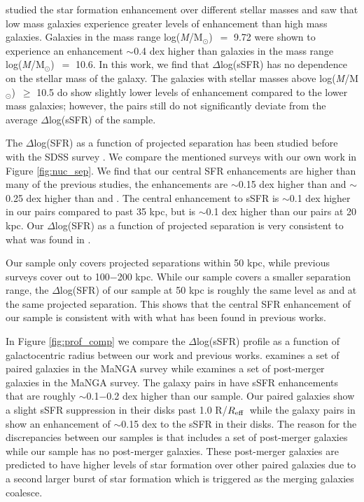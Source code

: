 \documentclass[iop,revtex4,twocolumn,apj,numberedappendix,appendixfloats]{emulateapj}
\newcommand{\reff}{$R_{\rm eff}$}
\newcommand{\logm}{log({\it M}/M$_{\odot}$)}
\begin{document}
\citet{Li:2008} studied the star formation enhancement over different stellar masses and saw that low mass galaxies experience greater levels of enhancement than high mass galaxies.  Galaxies in the mass range \logm\ $=$ 9.72 were shown to experience an enhancement $\sim$0.4 dex higher than galaxies in the mass range \logm\ $=$ 10.6. In this work, we find that $\Delta$log(sSFR) has no dependence on the stellar mass of the galaxy. The galaxies with stellar masses above \logm\ $\ge$ 10.5 do show slightly lower levels of enhancement compared to the lower mass galaxies; however, the pairs still do not significantly deviate from the average $\Delta$log(sSFR) of the sample.

The $\Delta$log(SFR) as a function of projected separation has been studied before with the SDSS survey \citep{Ellison:2008, Li:2008, Patton:2013, Scudder:2012, Bustamante:2020}. We compare the mentioned surveys with our own work in Figure \ref{fig:nuc_sep}. We find that our central SFR enhancements are higher than many of the previous studies, the enhancements are $\sim$0.15 dex higher than \citet{Scudder:2012} and $\sim$0.25 dex higher than \citet{Ellison:2008} and \citet{Bustamante:2020}. The central enhancement to sSFR is $\sim$0.1 dex higher in our pairs compared to \citet{Li:2008} past 35 kpc, but \citet{Li:2008} is $\sim$0.1 dex higher than our pairs at 20 kpc.  Our $\Delta$log(SFR) as a function of projected separation is very consistent to what was found in \citet{Patton:2013}.

Our sample only covers projected separations within 50 kpc, while previous surveys cover out to 100$-$200 kpc. While our sample covers a smaller separation range, the $\Delta$log(SFR) of our sample at 50 kpc is roughly the same level as \citet{Scudder:2012} and \citet{Patton:2013} at the same projected separation. This shows that the central SFR enhancement of our sample is consistent with with what has been found in previous works. 

In Figure \ref{fig:prof_comp} we compare the $\Delta$log(sSFR) profile as a function of galactocentric radius between our work and previous works. \citet{Pan:2019} examines a set of paired galaxies in the MaNGA survey while \citet{Thorp:2019} examines a set of post-merger galaxies in the MaNGA survey. The galaxy pairs in \citet{Pan:2019} have sSFR enhancements that are roughly $\sim$0.1$-$0.2 dex higher than our sample. Our paired galaxies show a slight sSFR suppression in their disks past 1.0 R/\reff\ while the galaxy pairs in \citet{Pan:2019} show an enhancement of $\sim$0.15 dex to the sSFR in their disks. The reason for the discrepancies between our samples is that \citet{Pan:2019} includes a set of post-merger galaxies while our sample has no post-merger galaxies. These post-merger galaxies are predicted to have higher levels of star formation over other paired galaxies due to a second larger burst of star formation which is triggered as the merging galaxies coalesce. 
\end{document}
